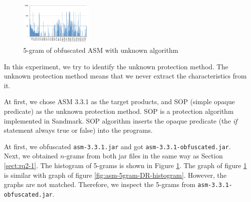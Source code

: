 \documentclass[conference]{IEEEtran}
\begin{document}

\begin{figure}[b]
  \centering
  \includegraphics[clip,width=0.32\textwidth]{images/SOP_ASM}
  \caption{5-gram of obfuscated ASM with unknown algorithm}
  \label{fig:SOP}
\end{figure}



In this experiment, we try to identify the unknown protection method.
The unknown protection method means that we never extract the
characteristics from it.

At first, we chose ASM 3.3.1 as the target products, and SOP (simple
opaque predicate) as the unknown protection method.  SOP is a
protection algorithm implemented in Sandmark.  SOP algorithm inserts
the opaque predicate (the \emph{if} statement always true or false)
into the programs.

At first, we obfuscated \texttt{asm-3.3.1.jar} and got
\texttt{asm-3.3.1-obfuscated.jar}.
%
Next, we obtained $n$-grams from both jar files in the same way as
Section \ref{sect:rq2-1}.  The histogram of 5-grams is shown in Figure
\ref{fig:SOP}.  The graph of figure \ref{fig:SOP} is similar with
graph of figure \ref{fig:asm-5gram-DR-histogram}.  However, the graphs
are not matched.  Therefore, we inspect the 5-grams from
\texttt{asm-3.3.1-obfuscated.jar}.
\end{document}
